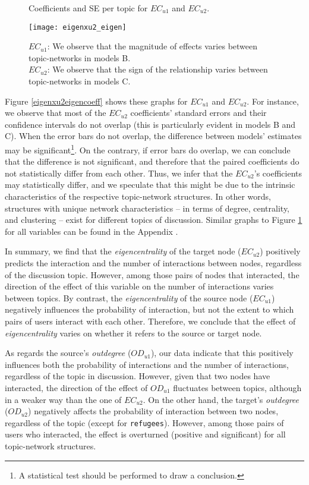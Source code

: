 \begin{figure}
\caption{Coefficients and SE per topic for $EC_{u1}$ and $EC_{u2}$.}\label{eigenxu2eigencoeff}
\texttt{[image: eigenxu2\_eigen]}
\caption*{\footnotesize$EC_{u1}$: We observe that the magnitude of effects varies between topic-networks in models B.\\$EC_{u2}$: We observe that the sign of the relationship varies between topic-networks in models C.}
\end{figure}

Figure \vref{eigenxu2eigencoeff} shows these graphs for $EC_{u1}$ and $EC_{u2}$. For instance, we observe that most of the $EC_{u2}$ coefficients' standard errors and their confidence intervals do not overlap (this is particularly evident in models B and C). When the error bars do not overlap, the difference between models' estimates may be significant\footnote{A statistical test should be performed to draw a conclusion.}. On the contrary, if error bars do overlap, we can conclude that the difference is not significant, and therefore that the paired coefficients do not statistically differ from each other. Thus, we infer that the $EC_{u2}$'s coefficients may statistically differ, and we speculate that this might be due to the intrinsic characteristics of the respective topic-network structures. In other words, structures with unique network characteristics – in terms of degree, centrality, and clustering – exist for different topics of discussion.
Similar graphs to Figure \ref{eigenxu2eigencoeff} for all variables can be found in the Appendix .

In summary, we find that the \textit{eigencentrality} of the target node ($EC_{u2}$) positively predicts the interaction and the number of interactions between nodes, regardless of the discussion topic. However, among those pairs of nodes that interacted, the direction of the effect of this variable on the number of interactions varies between topics. By contrast, the \textit{eigencentrality} of the source node ($EC_{u1}$) negatively influences the probability of interaction, but not the extent to which pairs of users interact with each other. Therefore, we conclude that the effect of \textit{eigencentrality} varies on whether it refers to the source or target node.

As regards the source's \textit{outdegree} ($OD_{u1}$), our data indicate that this positively influences both the probability of interactions and the number of interactions, regardless of the topic in discussion. However, given that two nodes have interacted, the direction of the effect of $OD_{u1}$ fluctuates between topics, although in a weaker way than the one of $EC_{u2}$. On the other hand, the target's \textit{outdegree} ($OD_{u2}$) negatively affects the probability of interaction between two nodes, regardless of the topic (except for \texttt{refugees}). However, among those pairs of users who interacted, the effect is overturned (positive and significant) for all topic-network structures.

